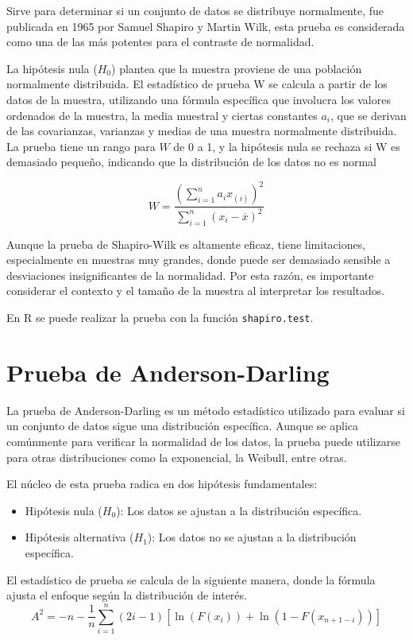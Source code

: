 \documentclass{article}
\begin{document}
Sirve para determinar si un conjunto de datos se distribuye normalmente, fue publicada en 1965 por Samuel Shapiro y Martin Wilk, esta prueba es considerada como una de las más potentes para el contraste de normalidad.

La hipótesis nula ($H_0$) plantea que la muestra proviene de una población normalmente distribuida. El estadístico de prueba W se calcula a partir de los datos de la muestra, utilizando una fórmula específica que involucra los valores ordenados de la muestra, la media muestral y ciertas constantes $a_i$, que se derivan de las covarianzas, varianzas y medias de una muestra normalmente distribuida. La prueba tiene un rango para $W$ de 0 a 1, y la hipótesis nula se rechaza si W es demasiado pequeño, indicando que la distribución de los datos no es normal

\[W = \frac{\left(\sum_{i=1}^{n}a_{i}x_{(i)}\right)^{2}}{\sum_{i=1}^{n}(x_{i}-\overline{x})^{2}}
\]

Aunque la prueba de Shapiro-Wilk es altamente eficaz, tiene limitaciones, especialmente en muestras muy grandes, donde puede ser demasiado sensible a desviaciones insignificantes de la normalidad. Por esta razón, es importante considerar el contexto y el tamaño de la muestra al interpretar los resultados.

En R se puede realizar la prueba con la función \texttt{shapiro.test}.

\section{Prueba de Anderson-Darling}

La prueba de Anderson-Darling es un método estadístico utilizado para evaluar si un conjunto de datos sigue una distribución específica. Aunque se aplica comúnmente para verificar la normalidad de los datos, la prueba puede utilizarse para otras distribuciones como la exponencial, la Weibull, entre otras.

El núcleo de esta prueba radica en dos hipótesis fundamentales:

\begin{itemize}
    \item Hipótesis nula (\(H_0\)): Los datos se ajustan a la distribución específica.
    \item Hipótesis alternativa (\(H_1\)): Los datos no se ajustan a la distribución específica.
\end{itemize}

El estadístico de prueba se calcula de la siguiente manera, donde la fórmula ajusta el enfoque según la distribución de interés.
\[A^2 = -n - \frac{1}{n} \sum_{i=1}^{n} (2i-1) \left[ \ln(F(x_i)) + \ln(1-F(x_{n+1-i})) \right]\]
\end{document}
